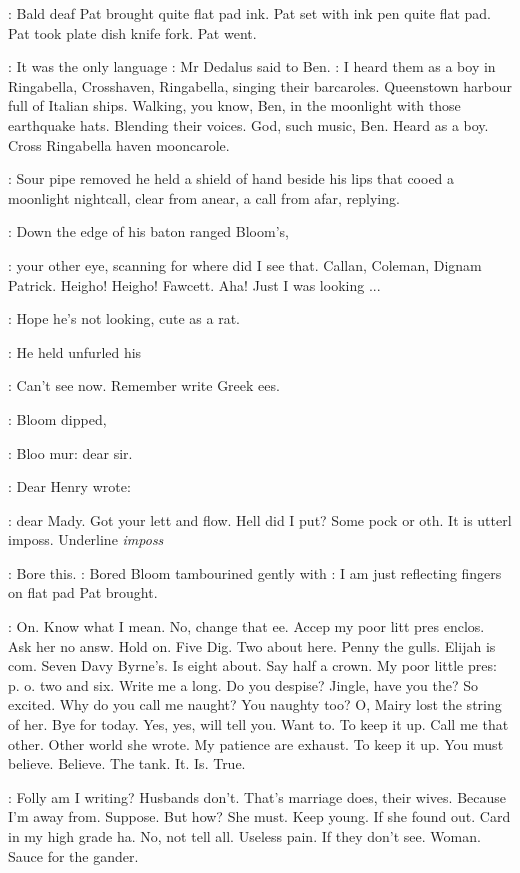 :
Bald deaf Pat brought quite flat pad ink.
Pat set with ink pen quite
flat pad.
Pat took plate dish knife fork.
Pat went.

\simon:
It was the only language
:
Mr Dedalus said to Ben.
\simon:
I heard them as a
boy in Ringabella,
Crosshaven,
Ringabella,
singing their barcaroles.
Queenstown harbour full of Italian ships.
Walking,
you know,
Ben,
in the
moonlight with those earthquake hats.
Blending their voices.
God,
such
music,
Ben.
Heard as a boy.
Cross Ringabella haven mooncarole.

:
Sour pipe removed he held a shield of hand beside his lips that cooed
a moonlight nightcall,
clear from anear,
a call from afar,
replying.

:
Down the edge of his  baton ranged Bloom's,

\BloomInt:
your other eye,
scanning for where did I see that.
Callan,
Coleman,
Dignam Patrick.
Heigho!
Heigho!
Fawcett.
Aha!
Just I was looking ...

\BloomInt:
Hope he's not looking,
cute as a rat.

:
He held unfurled his 

\BloomInt:
Can't see now.
Remember write Greek ees.

:
Bloom dipped,

\BloomInt:
Bloo mur:
dear sir.

:
Dear Henry wrote:

\BloomInt:
dear Mady.
Got your lett and flow.
Hell did I put?
Some pock or oth.
It is utterl imposs.
Underline \emph{imposs}

\BloomInt:
Bore this.
:
Bored Bloom tambourined gently with
\BloomInt:
I am just reflecting
fingers on flat pad Pat brought.

\BloomInt:
On.
Know what I mean.
No,
change that ee.
Accep my poor litt pres
enclos.
Ask her no answ.
Hold on.
Five Dig.
Two about here.
Penny the
gulls.
Elijah is com.
Seven Davy Byrne's.
Is eight about.
Say half a
crown.
My poor little pres:
p.
o.
two and six.
Write me a long.
Do you
despise?
Jingle,
have you the?
So excited.
Why do you call me naught?
You naughty too?
O,
Mairy lost the string of her.
Bye for today.
Yes,
yes,
will tell you.
Want to.
To keep it up.
Call me that other.
Other world she
wrote.
My patience are exhaust.
To keep it up.
You must believe.
Believe.
The tank.
It.
Is.
True.

\BloomInt:
Folly am I writing?
Husbands don't.
That's marriage does,
their
wives.
Because I'm away from.
Suppose.
But how?
She must.
Keep young.
If she found out.
Card in my high grade ha.
No,
not tell all.
Useless
pain.
If they don't see.
Woman.
Sauce for the gander.

